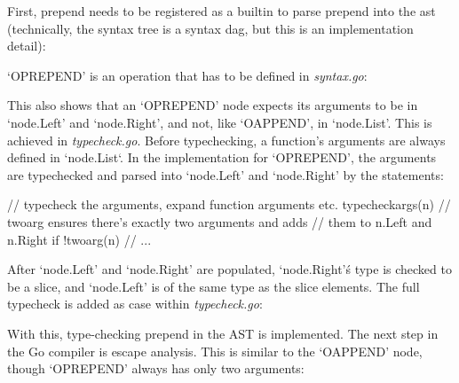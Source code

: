 
First, prepend needs to be registered as a builtin to parse prepend into
the \gls{ast} (technically, the syntax tree is a syntax \gls{dag}\cite{ast-node-dag},
but this is an implementation detail):

\begin{code}
\end{code}

`OPREPEND' is an operation that has to be defined in \textit{syntax.go}:

\begin{code}
\end{code}

This also shows that an `OPREPEND' node expects its arguments to be in `node.Left'
and `node.Right', and not, like `OAPPEND', in `node.List'. This is achieved in
\textit{typecheck.go}. Before typechecking, a function's arguments are always
defined in `node.List`. In the implementation for `OPREPEND', the arguments are typechecked and parsed
into `node.Left' and `node.Right' by the statements:

\begin{gocode}
// typecheck the arguments, expand function arguments etc.
typecheckargs(n)
// twoarg ensures there's exactly two arguments and adds
// them to n.Left and n.Right
if !twoarg(n) {
    // ...
}
\end{gocode}

After `node.Left' and `node.Right' are populated, `node.Right'\'s type is checked to be
a slice, and `node.Left' is of the same type as the slice elements.
The full typecheck is added as case within \textit{typecheck.go}:
\begin{code}
\end{code}

With this, type-checking prepend in the AST is implemented.
The next step in the Go compiler is escape analysis. This is similar
to the `OAPPEND' node, though `OPREPEND' always has only two arguments:

